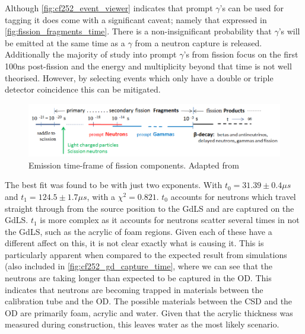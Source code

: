 \par
Although \autoref{fig:cf252_event_viewer} indicates that prompt $\gamma$'s can be used for tagging it does come with a significant caveat; namely that expressed in \autoref{fig:fission_fragments_time}.
There is a non-insignificant probability that $\gamma$'s will be emitted at the same time as a $\gamma$ from a neutron capture is released.
Additionally the majority of study into prompt $\gamma$'s from fission focus on the first 100ns post-fission and the energy and multiplicity beyond that time is not well theorised. 
However, by selecting events which only have a double or triple detector coincidence this can be mitigated.


\begin{figure}[!htbp]
\includegraphics[width=13cm]{Figures/NeutronCaptureTime/fission_fragment_times.png}
\centering
\caption{Emission time-frame of fission components. Adapted from \cite{cf252_fission_ref}}
\label{fig:fission_fragments_time}
\end{figure}







\par
The best fit was found to be with just two exponents.
With $t_0 = 31.39 \pm 0.4\mu s$ and $t_1 = 124.5 \pm 1.7\mu s$, with a $\chi^2=0.821$.
$t_0$ accounts for neutrons which travel straight through from the source position to the GdLS and are captured on the GdLS.
$t_1$ is more complex as it accounts for neutrons scatter several times in not the GdLS, such as the acrylic of foam regions.
Given each of these have a different affect on this, it is not clear exactly what is causing it.
This is particularly apparent when compared to the expected result from simulations (also included in \autoref{fig:cf252_gd_capture_time}, where we can see that the neutrons are taking longer than expected to be captured in the OD.
This indicates that neutrons are becoming trapped in materials between the calibration tube and the OD.
The possible materials between the CSD and the OD are primarily foam, acrylic and water.
Given that the acrylic thickness was measured during construction, this leaves water as the most likely scenario.

